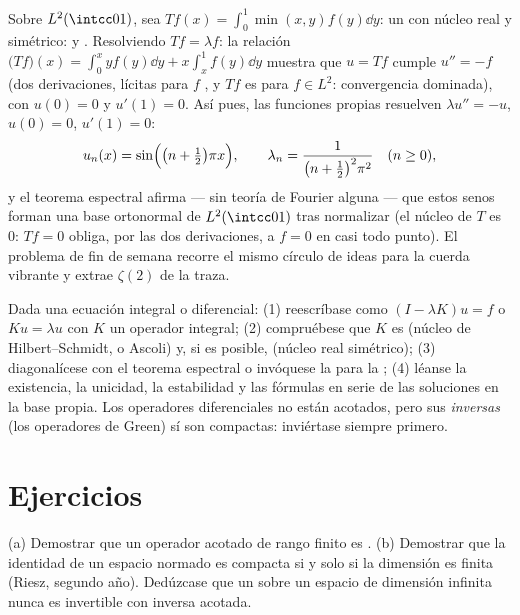 \begin{example}\label{ex:b3:spectral:minxy}
Sobre $L^2(\intcc01)$, sea $Tf(x) = \int_0^1\min(x, y)f(y)\dd y$: un
 con
núcleo real y simétrico:  y
. Resolviendo
$Tf = \lambda f$: la relación $\bigl(Tf\bigr)(x) = \int_0^xyf(y)\dd y +
x\int_x^1f(y)\dd y$ muestra que $u = Tf$ cumple $u'' = -f$ (dos
derivaciones, lícitas para $f$
, y $Tf$ es
 para $f \in L^2$:
convergencia dominada), con $u(0)
= 0$ y $u'(1) = 0$. Así pues, las funciones propias resuelven
$\lambda u'' =
-u$, $u(0) = 0$, $u'(1) = 0$:
\[
u_n(x) = \sin\Bigl(\bigl(n + \tfrac12\bigr)\pi x\Bigr),
\qquad
\lambda_n = \frac{1}{\bigl(n + \frac12\bigr)^2\pi^2}
\quad (n \geq 0),
\]
y el teorema espectral afirma --- sin teoría de Fourier alguna --- que
estos senos forman una base ortonormal de $L^2(\intcc01)$ tras
normalizar (el núcleo de $T$ es $0$: $Tf = 0$ obliga, por las dos
derivaciones, a $f = 0$ en casi todo punto). El problema de fin de
semana recorre el mismo círculo de ideas para la cuerda vibrante y
extrae $\zeta(2)$ de la traza.
\end{example}

\begin{method}\label{met:b3:spectral:method}
Dada una ecuación integral o diferencial: (1) reescríbase como
$(I - \lambda K)u = f$ o $Ku = \lambda u$ con $K$ un operador integral;
(2) compruébese que $K$ es 
(núcleo de Hilbert--Schmidt, o Ascoli) y, si es posible,
 (núcleo real
simétrico); (3) diagonalícese con el teorema espectral o invóquese la
 para la
; (4) léanse la existencia,
la unicidad, la estabilidad y las fórmulas en serie de las soluciones en
la base propia. Los operadores diferenciales no están acotados, pero sus
\emph{inversas} (los operadores de Green) sí son
compactas: inviértase siempre primero.
\end{method}

\section{Ejercicios}

\begin{exercise}[$\star$]\label{exo:b3:spectral:1}
(a) Demostrar que un operador acotado de rango finito es
. (b) Demostrar que la
identidad de un espacio normado es
compacta si y solo si la dimensión es
finita (Riesz, segundo año). Dedúzcase que un
 sobre un espacio de
dimensión infinita nunca es invertible con inversa acotada.
\end{exercise}

